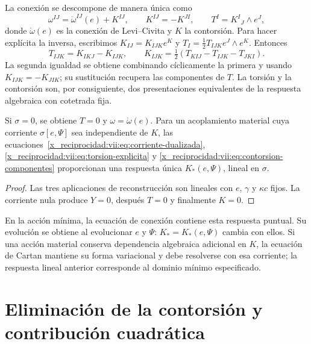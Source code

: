 \begin{HMTCompactSection}
La conexión se descompone de manera única como
\begin{equation}
 \omega^{IJ}=\mathring\omega^{IJ}(e)+K^{IJ},\qquad
 K^{IJ}=-K^{JI},\qquad T^I=K^I{}_{J}\wedge e^J,
 \label{x_reciprocidad:vii:eq:contorsion}
\end{equation}
donde \(\mathring\omega(e)\) es la conexión de Levi--Civita y
\(K\) la contorsión. Para hacer explícita la inversa, escribimos
\(K_{IJ}=K_{IJK}e^K\) y
\(T_I=\tfrac12T_{IJK}e^J\wedge e^K\). Entonces
\begin{equation}
 T_{IJK}=K_{IKJ}-K_{IJK},\qquad
 K_{IJK}=\tfrac12(T_{KIJ}-T_{IJK}-T_{JKI}).
 \label{x_reciprocidad:vii:eq:contorsion-componentes}
\end{equation}
La segunda igualdad se obtiene combinando cíclicamente la primera y
usando \(K_{IJK}=-K_{JIK}\); su sustitución recupera las componentes
de \(T\). La torsión y la contorsión son, por consiguiente, dos
presentaciones equivalentes de la respuesta algebraica con cotetrada fija.

\begin{corollary}
\label{x_reciprocidad:vii:cor:desacoplamiento-torsional}
Si \(\sigma=0\), se obtiene \(T=0\) y
\(\omega=\mathring\omega(e)\). Para un acoplamiento material cuya
corriente \(\sigma[e,\Psi]\) sea independiente de \(K\),
las ecuaciones~\eqref{x_reciprocidad:vii:eq:corriente-dualizada},
\eqref{x_reciprocidad:vii:eq:torsion-explicita} y
\eqref{x_reciprocidad:vii:eq:contorsion-componentes} proporcionan una respuesta única
\(K_*(e,\Psi)\), lineal en \(\sigma\).
\end{corollary}
\begin{proof}
Las tres aplicaciones de reconstrucción son lineales con \(e\),
\(\gamma\) y \(\kappa c\) fijos. La corriente nula produce
\(Y=0\), después \(T=0\) y finalmente \(K=0\).
\end{proof}

En la acción mínima, la ecuación de conexión contiene esta respuesta
puntual. Su evolución se obtiene al evolucionar \(e\) y \(\Psi\):
\(K_*=K_*(e,\Psi)\) cambia con ellos. Si una acción material conserva
dependencia algebraica adicional en \(K\), la ecuación de Cartan
mantiene su forma variacional y debe resolverse con esa corriente;
la respuesta lineal anterior corresponde al dominio mínimo especificado.

\section{Eliminación de la contorsión y contribución cuadrática}
\label{x_reciprocidad:vii:subsec:respuesta-cuadratica}


\end{HMTCompactSection}
